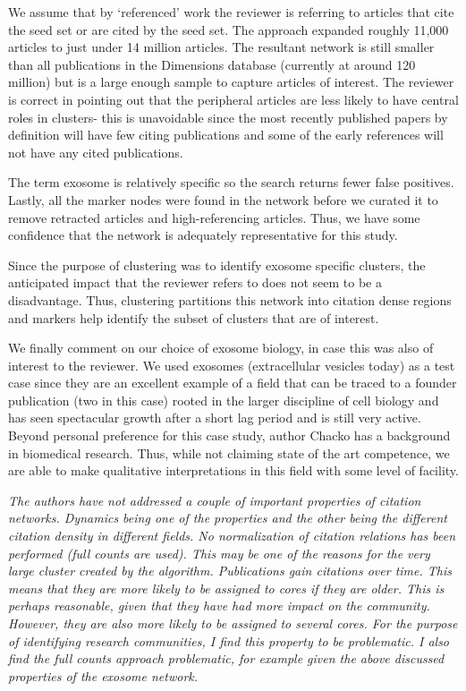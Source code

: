 \documentclass[11pt, oneside]{article}   	%
\begin{document}
We assume that by `referenced' work the reviewer is referring to articles that cite the seed set or are cited by the seed set. The approach expanded roughly 11,000 articles to just under 14 million articles. The resultant network is still smaller than all publications in the Dimensions database (currently at around 120 million) but is a large enough sample to capture articles of interest. The reviewer is correct in pointing out that the peripheral articles are less likely to have central roles in clusters- this is unavoidable since the most recently published papers by definition will have few citing publications and some of the early references will not have any cited publications. 

The term exosome is relatively specific so the search returns fewer false positives. Lastly, all the marker nodes were found in the network before we curated it to remove retracted articles and high-referencing articles. Thus, we have some confidence that the network is adequately representative for this study.  

Since the purpose of clustering was to identify exosome specific clusters, the anticipated impact that the reviewer refers to does not seem to be a disadvantage. Thus, clustering partitions this network into citation dense regions and markers help identify the subset of clusters that are of interest. 

We finally comment on our choice of exosome biology, in case this was also of interest to the reviewer. We used exosomes (extracellular vesicles today) as a test case since they are an excellent example of a field that can be traced to a founder publication (two in this case) rooted in the larger discipline of cell biology and has seen spectacular growth after a short lag period and is still very active. Beyond personal preference for this case study, author Chacko has a background in biomedical research. Thus, while not claiming state of the art competence, we are able to make qualitative interpretations in this field with some level of facility.  

\emph{The authors have not addressed a couple of important properties of citation networks. Dynamics being one of the properties and the other being the different citation density in different fields. No normalization of citation relations has been performed (full counts are used). This may be one of the reasons for the very large cluster created by the algorithm. Publications gain citations over time. This means that they are more likely to be assigned to cores if they are older. This is perhaps reasonable, given that they have had more impact on the community. However, they are also more likely to be assigned to several cores. For the purpose of identifying research communities, I find this property to be problematic. I also find the full counts approach problematic, for example given the above discussed properties of the exosome network.}
\end{document}
